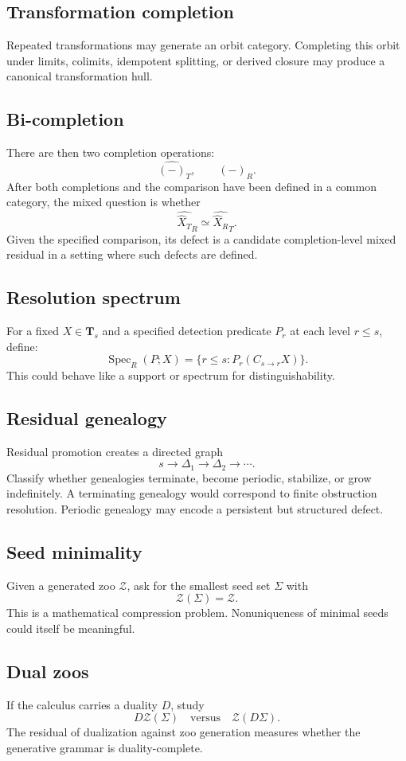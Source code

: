\documentclass[11pt]{article}
\theoremstyle{definition}
\theoremstyle{remark}
\newcommand{\Tcat}{\mathbf T}
\newcommand{\Zoo}{\mathcal Z}
\newcommand{\Seeds}{\Sigma}
\begin{document}
\subsection{Transformation completion}
Repeated transformations may generate an orbit category. Completing this orbit under limits, colimits, idempotent splitting, or derived closure may produce a canonical transformation hull.

\subsection{Bi-completion}
There are then two completion operations:
\[
\widehat{(-)}_T,
\qquad
\widehat{(-)}_R.
\]
After both completions and the comparison have been defined in a common category, the mixed question is whether
\[
\widehat{\widehat X_T}_R
\simeq
\widehat{\widehat X_R}_T.
\]
Given the specified comparison, its defect is a candidate completion-level mixed residual in a setting where such defects are defined.

\subsection{Resolution spectrum}
For a fixed $X\in\Tcat_s$ and a specified detection predicate $P_r$ at each level $r\le s$, define:
\[
\operatorname{Spec}_R(P;X)
=
\{r\le s:P_r(C_{s\to r}X)\}.
\]
This could behave like a support or spectrum for distinguishability.

\subsection{Residual genealogy}
Residual promotion creates a directed graph
\[
s\to\Delta_1\to\Delta_2\to\cdots.
\]
Classify whether genealogies terminate, become periodic, stabilize, or grow indefinitely. A terminating genealogy would correspond to finite obstruction resolution. Periodic genealogy may encode a persistent but structured defect.

\subsection{Seed minimality}
Given a generated zoo $\Zoo$, ask for the smallest seed set $\Seeds$ with
\[
\Zoo(\Seeds)=\Zoo.
\]
This is a mathematical compression problem. Nonuniqueness of minimal seeds could itself be meaningful.

\subsection{Dual zoos}
If the calculus carries a duality $D$, study
\[
D\Zoo(\Seeds)
\quad\text{versus}\quad
\Zoo(D\Seeds).
\]
The residual of dualization against zoo generation measures whether the generative grammar is duality-complete.
\end{document}
